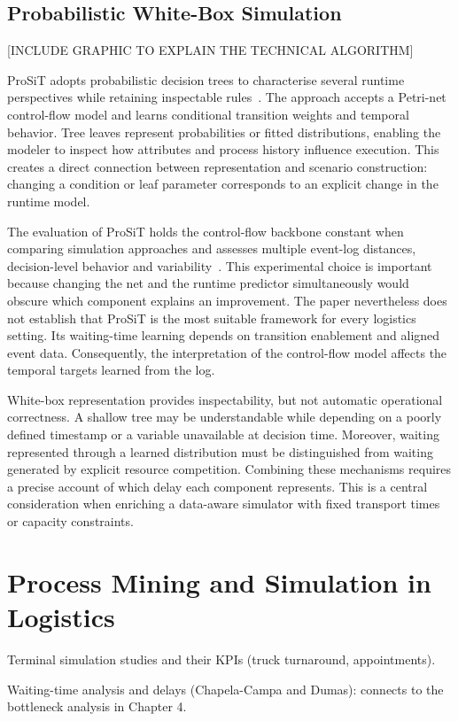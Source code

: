 \subsection{Probabilistic White-Box Simulation}
[INCLUDE GRAPHIC TO EXPLAIN THE TECHNICAL ALGORITHM]

ProSiT adopts probabilistic decision trees to characterise several runtime perspectives while retaining inspectable rules~\cite{Vinci2026prosit}. The approach accepts a Petri-net control-flow model and learns conditional transition weights and temporal behavior. Tree leaves represent probabilities or fitted distributions, enabling the modeler to inspect how attributes and process history influence execution. This creates a direct connection between representation and scenario construction: changing a condition or leaf parameter corresponds to an explicit change in the runtime model.

The evaluation of ProSiT holds the control-flow backbone constant when comparing simulation approaches and assesses multiple event-log distances, decision-level behavior and variability~\cite{Vinci2026prosit}. This experimental choice is important because changing the net and the runtime predictor simultaneously would obscure which component explains an improvement. The paper nevertheless does not establish that ProSiT is the most suitable framework for every logistics setting. Its waiting-time learning depends on transition enablement and aligned event data. Consequently, the interpretation of the control-flow model affects the temporal targets learned from the log.

White-box representation provides inspectability, but not automatic operational correctness. A shallow tree may be understandable while depending on a poorly defined timestamp or a variable unavailable at decision time. Moreover, waiting represented through a learned distribution must be distinguished from waiting generated by explicit resource competition. Combining these mechanisms requires a precise account of which delay each component represents. This is a central consideration when enriching a data-aware simulator with fixed transport times or capacity constraints.

\section{Process Mining and Simulation in Logistics}
\label{sec:rw_logistics}
\begin{hints}
\item Terminal simulation studies and their KPIs (truck turnaround, appointments).
\item Waiting-time analysis and delays (Chapela-Campa and Dumas): connects to the bottleneck analysis in Chapter 4.
\end{hints}

